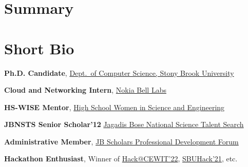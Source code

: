 \documentclass[letterpaper,10pt]{article}
\begin{document}
\section{Summary}


\begin{minipage}{0.65\textwidth}
\section{Short Bio}
\resumeSubHeadingListStart
\item \textbf{Ph.D. Candidate}, \href{https://www.cs.stonybrook.edu/}{Dept.\ of Computer Science, Stony Brook University}
\item \textbf{Cloud and Networking Intern}, \href{https://www.bell-labs.com/}{Nokia Bell Labs}
\item \textbf{HS-WISE Mentor}, \href{https://www.stonybrook.edu/commcms/wise/pre-college/high_school.php}{High School Women in Science and Engineering}
\item \textbf{JBNSTS Senior Scholar'12} \href{https://jbnsts.ac.in}{Jagadis Bose National Science Talent Search}
\item \textbf{Administrative Member}, \href{https://sites.google.com/view/jbspdf/home}{JB Scholars Professional Development Forum}
\item \textbf{Hackathon Enthusiast}, Winner of \href{https://devpost.com/software/cryptopiens}{Hack@CEWIT'22}, \href{https://devpost.com/software/steganography-attack}{SBUHack'21}, etc.
\resumeSubHeadingListEnd
\end{minipage}
\begin{minipage}{0.2\textwidth}
\end{minipage}
\end{document}
